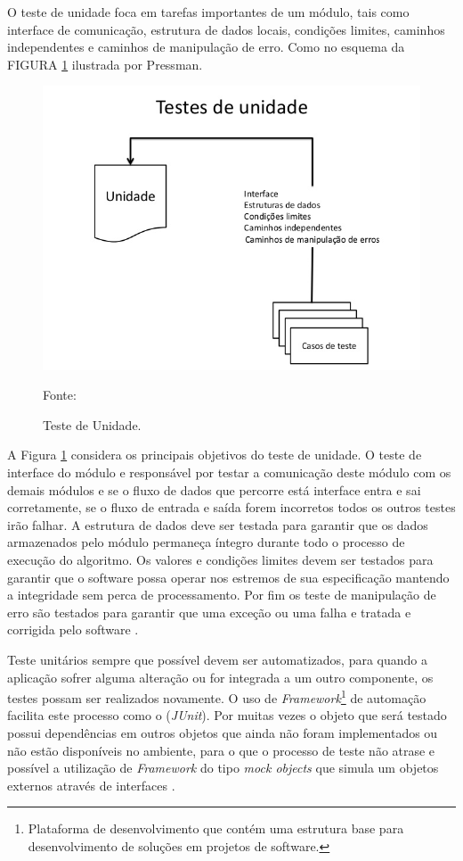 O teste de unidade foca em tarefas importantes de um módulo, tais como interface de comunicação, estrutura de dados locais, condições limites, caminhos independentes e caminhos de manipulação de erro. Como no esquema da FIGURA \ref{unidade} ilustrada por Pressman.

\begin{figure}[H]
	\centering
	\includegraphics[scale=0.5]{dados/figuras/testeDeUnidade.jpg}
	\caption{Teste de Unidade.}
	Fonte: \cite[p.~474]{PRESMA2016}
	\label{unidade}
\end{figure}

A Figura \ref{unidade} considera os principais objetivos do teste de unidade. O teste de interface do módulo e responsável por testar a comunicação deste módulo com os demais módulos e se o fluxo de dados que percorre está interface entra e sai corretamente, se o fluxo de entrada e saída forem incorretos todos os outros testes irão falhar. A estrutura de dados deve ser testada para garantir que os dados armazenados pelo módulo permaneça íntegro durante todo o processo de execução do algoritmo. Os valores e condições limites devem ser testados para garantir que o software possa operar nos estremos de sua especificação mantendo a integridade sem perca de processamento. Por fim os teste de manipulação de erro são testados para garantir que uma exceção ou uma falha e tratada e corrigida pelo software \cite{PRESMA2016}.

Teste unitários sempre que possível devem ser automatizados, para quando a aplicação sofrer alguma alteração ou for integrada a um outro componente, os testes possam ser realizados novamente. O uso de \textit{Framework}\footnote{Plataforma de desenvolvimento que contém uma estrutura base para desenvolvimento de soluções em projetos de software.} de automação facilita este processo como o (\textit{JUnit}). Por muitas vezes o objeto que será testado possui dependências em outros objetos que ainda não foram implementados ou não estão disponíveis no ambiente, para o que o processo de teste não atrase e possível a utilização de \textit{Framework} do tipo \textit{mock objects} que simula um objetos externos através de interfaces \cite{SOMMER2011}. 



